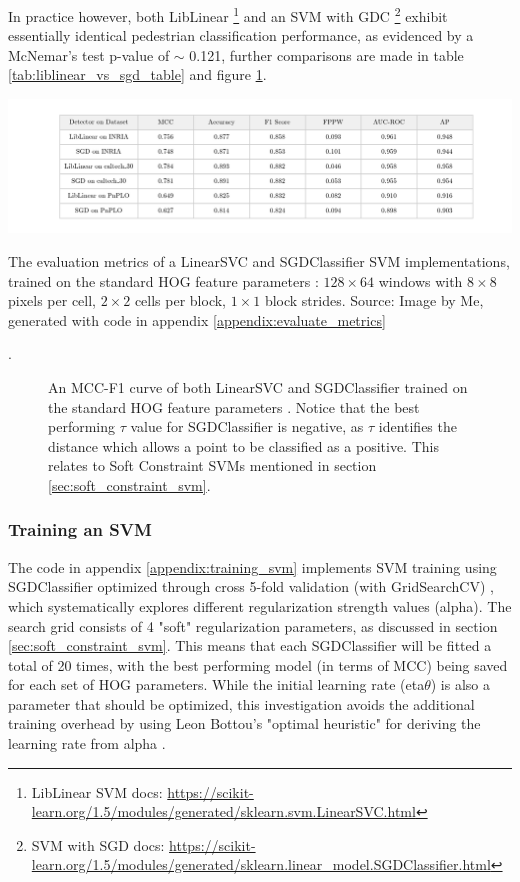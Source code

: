     In practice however, both LibLinear \footnote{LibLinear SVM docs: \url{https://scikit-learn.org/1.5/modules/generated/sklearn.svm.LinearSVC.html}} and an SVM with GDC \footnote{SVM with SGD docs: \url{https://scikit-learn.org/1.5/modules/generated/sklearn.linear_model.SGDClassifier.html}} exhibit essentially identical pedestrian classification performance, as evidenced by a McNemar's test p-value of $\sim$ 0.121, further comparisons are made in table \ref{tab:liblinear_vs_sgd_table} and figure \ref{fig:liblinear_vs_sgd_curve}.

    \begin{table}
        \includegraphics[width=\linewidth]{images/liblinear_vs_sgd_table.png}
        \caption{The evaluation metrics of a LinearSVC and SGDClassifier SVM implementations, trained on the standard HOG feature parameters \cite{dalal_2005_histograms}: $128\times64$ windows with $8\times8$ pixels per cell, $2\times2$ cells per block, $1\times1$ block strides. Source: Image by Me, generated with code in appendix \ref{appendix:evaluate_metrics}}
        \label{tab:liblinear_vs_sgd_table}. 
    \end{table}


    \begin{figure}
        \centering
        
        \caption{An MCC-F1 curve of both LinearSVC and SGDClassifier trained on the standard HOG feature parameters \cite{dalal_2005_histograms}. Notice that the best performing $\tau$ value for SGDClassifier is negative, as $\tau$ identifies the distance which allows a point to be classified as a positive. This relates to Soft Constraint SVMs mentioned in section \ref{sec:soft_constraint_svm}.}
        \label{fig:liblinear_vs_sgd_curve}
    \end{figure}

    \subsubsection{Training an SVM}

    The code in appendix \ref{appendix:training_svm} implements SVM training using SGDClassifier optimized through cross 5-fold validation (with GridSearchCV) \cite{cornell_hyperoptimization}, which systematically explores different regularization strength values (alpha). The search grid consists of 4 "soft" regularization parameters, as discussed in section \ref{sec:soft_constraint_svm}. This means that each SGDClassifier will be fitted a total of 20 times, with the best performing model (in terms of MCC) being saved for each set of HOG parameters. While the initial learning rate (eta$\theta$) is also a parameter that should be optimized, this investigation avoids the additional training overhead by using Leon Bottou's "optimal heuristic" for deriving the learning rate from alpha \cite{sgd_leon}.

